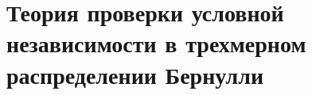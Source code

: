 \documentclass[a4paper,14pt]{extarticle}
\theoremstyle{definition}
\begin{document}

\newpage

\tableofcontents
\newpage
\section{Теория проверки условной независимости в трехмерном распределении Бернулли}









% 



\newpage
\printbibliography
\end{document}
